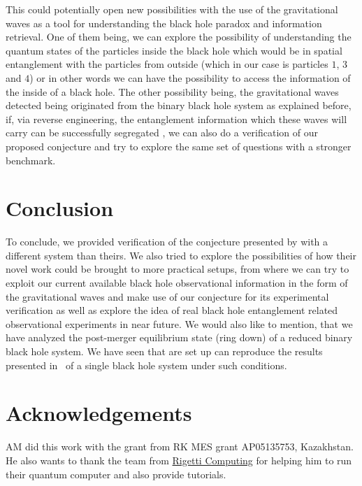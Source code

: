 \documentclass[fleqn,usenatbib]{mnras}
\begin{document}
This could potentially open new possibilities with the use of the gravitational waves as a tool for understanding the black hole paradox and information retrieval.  One of them being, we can explore the possibility of understanding the quantum states of the particles inside the black hole which would be in spatial entanglement with the particles from outside (which in our case is particles $1$, $3$ and $4$) or in other words we can have the possibility to access the information of the inside of a black hole. The other possibility being, the gravitational waves detected being originated from the binary black hole system as explained before, if, via reverse engineering, the entanglement information which these waves will carry can be successfully segregated \citep{ent0,ent1}, we can also do a verification of our proposed conjecture and try to explore the same set of questions with a stronger benchmark. 

\section{Conclusion}\label{sec5}
To conclude, we provided verification of the conjecture presented by \citep{monogamy} with a different system than theirs. We also tried to explore the possibilities of how their novel work could be brought to more practical setups, from where we can try to exploit our current available black hole observational information in the form of the gravitational waves and make use of our conjecture for its experimental verification as well as explore the idea of real black hole entanglement related observational experiments in near future.  We would also like to mention, that we have analyzed the post-merger equilibrium state (ring down) of a reduced binary black hole system. We have seen that are set up can reproduce the results presented in~\citep{monogamy} of a single black hole system under such conditions. 





\section*{Acknowledgements}
AM did this work with the grant from RK MES grant AP05135753, Kazakhstan. He also wants to thank the team from \href{https://rigetti.com/}{Rigetti Computing}    for helping him to run their quantum computer and also provide tutorials.
\end{document}

